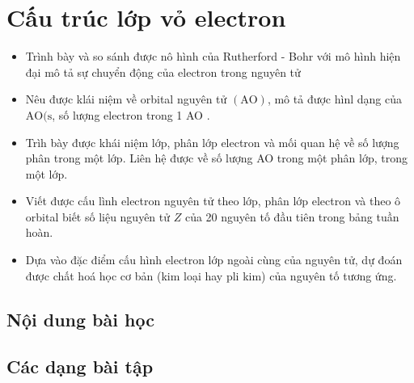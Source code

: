 \section{Cấu trúc lớp vỏ electron}
\begin{Muctieu}
	\begin{itemize}
		\item  Trình bày và so sánh được nô hình của Rutherford - Bohr với mô hình hiện đại mô tả sự chuyển động của electron trong nguyên tử
		\item  Nêu được klái niệm về orbital nguyên tử $(\mathrm{AO})$, mô tả được hìnl dạng của $\mathrm{AO}(\mathrm{s}$, số lượng electron trong 1 AO .
		\item  Trìh bày được khái niệm lớp, phân lớp electron và mối quan hệ về số lượng phân trong một lớp. Liên hệ được về số lượng AO trong một phân lớp, trong một lớp.
		\item  Viết được cấu lình electron nguyên tử theo lớp, phân lớp electron và theo ô orbital biết số liệu nguyên tử $Z$ của 20 nguyên tố đầu tiên trong bảng tuần hoàn.
		\item  Dựa vào đặc điểm cấu hình electron lớp ngoài cùng của nguyên tử, dự đoán được chất hoá học cơ bản (kim loại hay pli kim) của nguyên tố tương ứng.
	\end{itemize}
\end{Muctieu}
\subsection{Nội dung bài học}
 
\subsection{Các dạng bài tập}
